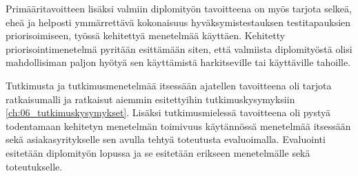 Primääritavoitteen lisäksi valmiin diplomityön tavoitteena on myös tarjota selkeä, eheä ja helposti ymmärrettävä kokonaisuus hyväksymistestauksen testitapauksien priorisoimiseen, työssä kehitettyä menetelmää käyttäen.
Kehitetty priorisointimenetelmä pyritään esittämään siten, että valmiista diplomityöstä olisi mahdollisiman paljon hyötyä sen käyttämistä harkitseville tai käyttäville tahoille.

Tutkimusta ja tutkimusmenetelmää itsessään ajatellen tavoitteena oli tarjota ratkaisumalli ja ratkaisut aiemmin esitettyihin tutkimuskysymyksiin \ref{ch:06_tutkimuskysymykset}.
Lisäksi tutkimusmielessä tavoitteena oli pystyä todentamaan kehitetyn menetelmän toimivuus käytännössä menetelmää itsessään sekä asiakasyritykselle sen avulla tehtyä toteutusta evaluoimalla.
Evaluointi esitetään diplomityön lopussa ja se esitetään erikseen menetelmälle sekä toteutukselle.
